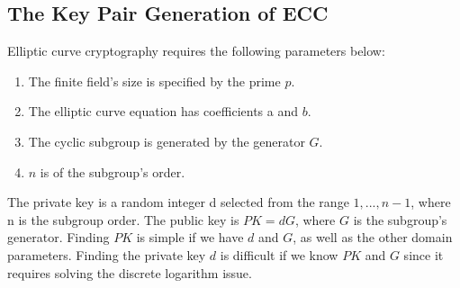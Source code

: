 \subsection{The Key Pair Generation of ECC}
Elliptic curve cryptography requires the following parameters below:
\begin{enumerate}
\item The finite field's size is specified by the prime $p$.
\item The elliptic curve equation has coefficients a and $b$.
\item The cyclic subgroup is generated by the generator $G$.
\item $n$ is of the subgroup's order.
\end{enumerate}
The private key is a random integer d selected from the range ${1,...,n-1}$, where n is the subgroup order. The public key is $PK=dG$, where $G$ is the subgroup's generator.
Finding $PK$ is simple if we have $d$ and $G$, as well as the other domain parameters. Finding the private key $d$ is difficult if we know $PK$ and $G$ since it requires solving the discrete logarithm issue.
